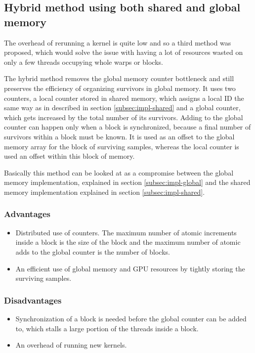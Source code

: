 \subsection{Hybrid method using both shared and global memory}\label{subsec:impl-hybrid}

The overhead of rerunning a kernel is quite low and so a third method was proposed, which would solve the issue with having a lot of resources wasted on only a few threads occupying whole warps or blocks.

The hybrid method removes the global memory counter bottleneck and still preserves the efficiency of organizing survivors in global memory. It uses two counters, a local counter stored in shared memory, which assigns a local ID the same way as in described in section \ref{subsec:impl-shared} and a global counter, which gets increased by the total number of its survivors. Adding to the global counter can happen only when a block is synchronized, because a final number of survivors within a block must be known. It is used as an offset to the global memory array for the block of surviving samples, whereas the local counter is used an offset within this block of memory.

Basically this method can be looked at as a compromise between the global memory implementation, explained in section \ref{subsec:impl-global} and the shared memory implementation explained in section \ref{subsec:impl-shared}.

\subsubsection{Advantages}

\begin{itemize}
	\item Distributed use of counters. The maximum number of atomic increments inside a block is the size of the block and the maximum number of atomic adds to the global counter is the number of blocks.
	\item An efficient use of global memory and GPU resources by tightly storing the surviving samples.
\end{itemize}

\subsubsection{Disadvantages}

\begin{itemize}
	\item Synchronization of a block is needed before the global counter can be added to, which stalls a large portion of the threads inside a block.
	\item An overhead of running new kernels.
\end{itemize}

